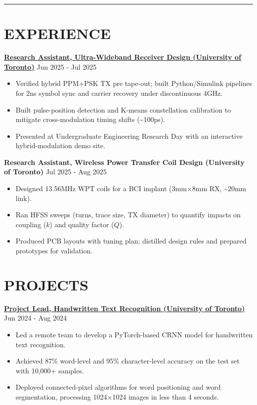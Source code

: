 \documentclass[a4paper,10pt]{article}
\begin{document}
\noindent\rule{\linewidth}{1pt}

\section*{\textbf{EXPERIENCE}}

\noindent\href{https://github.com/Ken-2511/ppm-psk-visualize}{\uline{\textbf{Research Assistant, Ultra-Wideband Receiver Design (University of Toronto)}}} \hfill Jun 2025 - Jul 2025
\begin{itemize}[leftmargin=0.2in]
    \item Verified hybrid PPM+PSK TX pre tape-out; built Python/Simulink pipelines for 2ns symbol sync and carrier recovery under discontinuous 4GHz.
    \item Built pulse-position detection and K-means constellation calibration to mitigate cross-modulation timing shifts (\textasciitilde100ps).
    \item Presented at Undergraduate Engineering Research Day with an interactive hybrid-modulation demo site.
\end{itemize}

\vspace{0.3cm}
\noindent\textbf{Research Assistant, Wireless Power Transfer Coil Design (University of Toronto)} \hfill Jul 2025 - Aug 2025
\begin{itemize}[leftmargin=0.2in]
    \item Designed 13.56MHz WPT coils for a BCI implant (3mm×8mm RX, \textasciitilde20mm link).
    \item Ran HFSS sweeps (turns, trace size, TX diameter) to quantify impacts on coupling ($k$) and quality factor ($Q$).
    \item Produced PCB layouts with tuning plan; distilled design rules and prepared prototypes for validation.
\end{itemize}

\section*{\textbf{PROJECTS}}

\noindent\href{https://github.com/Ken-2511/HandwritingRecognition}{\uline{
\textbf{Project Lead, Handwritten Text Recognition (University of Toronto)}}} \hfill Jun 2024 - Aug 2024
\begin{itemize}[leftmargin=0.2in]
    \item Led a remote team to develop a PyTorch-based CRNN model for handwritten text recognition.
    \item Achieved 87\% word-level and 95\% character-level accuracy on the test set with 10,000+ samples.
    \item Deployed connected-pixel algorithms for word positioning and word segmentation, processing 1024$\times$1024 images in less than 4 seconds.
\end{itemize}
\end{document}
